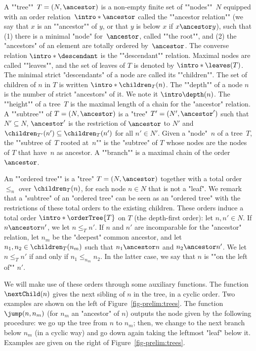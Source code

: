 \documentclass[10pt,a4paper]{amsart}
\begin{document}
\AP A ""tree""~$T=(N,\ancestor)$ is a non-empty finite set of ""nodes""~$N$ equipped with an order relation~$\intro*\ancestor$ called the ""ancestor relation"" (we say that $x$ is an ""ancestor"" of $y$, or that $y$ is below $x$ if $x\ancestor y$), such that
(1) there is a minimal "node" for~$\ancestor$, called ""the root"", and
(2) the "ancestors" of an element are totally ordered by~$\ancestor$.
\AP The converse relation $\intro*\descendant$ is the ""descendant"" relation.
\AP Maximal nodes are called ""leaves"", and the set of leaves of $T$ is denoted by $\intro*\leaves(T)$. 
\AP The minimal strict "descendants" of a node are called its ""children"". The set of children of $n$ in $T$ is written $\intro*\children_T(n)$.
\AP The ""depth"" of a node $n$ is the number of strict "ancestors" of it. We note it $\intro\depth(n)$.
\AP The ""height"" of a tree~$T$ is the maximal length of a chain for the "ancestor" relation. 
\AP A ""subtree""  of $T=(N,\ancestor)$ is a "tree" $T'=(N', \ancestor')$ such that $N'\subseteq N$, $\ancestor'$ is the restriction of $\ancestor$ to $N'$ and $\children_{T'}(n') \subseteq \children_T(n')$ for all $n'\in N'$.
\AP Given a "node"~$n$ of a tree~$T$, the ""subtree of~$T$ rooted at~$n$"" is the "subtree" of $T$ whose nodes are the nodes of $T$ that have~$n$ as ancestor. 
\AP A ""branch"" is a maximal chain of the order $\ancestor$.

 
\AP An ""ordered tree"" is a "tree" $T = (N, \ancestor)$ together with a total order $\leq_n$ over $\children_T(n)$, for each node $n\in N$ that is not a "leaf". We remark that a "subtree" of an "ordered tree" can be seen as an "ordered tree" with the restrictions of these total orders to the existing children. 
\AP These orders induce a total order $\intro*\orderTree{T}$ on $T$ (the depth-first order): let $n, n'\in N$. If $n \ancestor n'$, we let $n \leq_T n'$. If $n$ and $n'$ are incomparable for the "ancestor" relation, let $n_m$ be the "deepest" common ancestor, and let $n_1, n_2\in \children_{T}(n_m)$ such that $n_1\ancestor n$ and $n_2 \ancestor n'$. We let $n \leq_T n'$ if and only if $n_1 \leq_{n_m} n_2$.
\AP In the latter case, we say that $n$ is ""on the left of"" $n'$.


We will make use of these orders through some auxiliary functions.
The function $\nextChild(n)$ gives the next sibling of $n$ in the tree, in a cyclic order. Two examples are shown on the left of Figure~\ref{fig-prelim:trees}.
The function $\jump(n, n_m)$ (for $n_m$ an "ancestor" of $n$) outputs the node given by the following  procedure: we go up the tree from $n$ to $n_m$; then, we change to the next branch below $n_m$ (in a cyclic way) and go down again taking the leftmost "leaf" below it. 
Examples are given on the right of Figure~\ref{fig-prelim:trees}.
\end{document}
